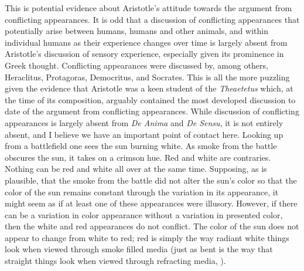 \documentclass[12pt]{article}
\begin{document}
This is potential evidence about Aristotle's attitude towards the argument from conflicting appearances. It is odd that a discussion of conflicting appearances that potentially arise between humans, humans and other animals, and within individual humans as their experience changes over time is largely absent from Aristotle's discussion of sensory experience, especially given its prominence in Greek thought. Conflicting appearances were discussed by, among others, Heraclitus, Protagoras, Democritus, and Socrates. This is all the more puzzling given the evidence that Aristotle was a keen student of the \emph{Theaetetus} which, at the time of its composition, arguably contained the most developed discussion to date of the argument from conflicting appearances. While discussion of conflicting appearances is largely absent from \emph{De Anima} and \emph{De Sensu}, it is not entirely absent, and I believe we have an important point of contact here. Looking up from a battlefield one sees the sun burning white. As smoke from the battle obscures the sun, it takes on a crimson hue. Red and white are contraries. Nothing can be red and white all over at the same time. Supposing, as is plausible, that the smoke from the battle did not alter the sun's color so that the color of the sun remains constant through the variation in its appearance, it might seem as if at least one of these appearances were illusory. However, if there can be a variation in color appearance without a variation in presented color, then the white and red appearances do not conflict. The color of the sun does not appear to change from white to red; red is simply the way radiant white things look when viewed through smoke filled media (just as bent is the way that straight things look when viewed through refracting media, \citealt{Austin:1962lr}).
\end{document}
